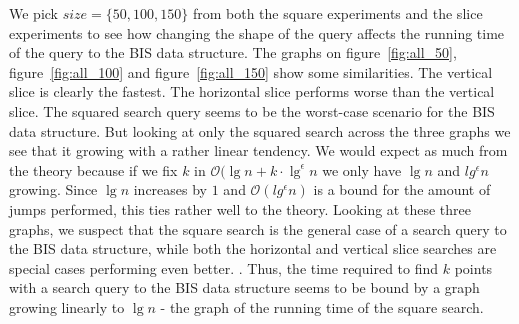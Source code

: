 We pick $size=\{50,100,150\}$ from both the square experiments and the slice experiments to see how changing the shape of the query affects the running time of the query to the BIS data structure. The graphs on figure~\ref{fig:all_50}, figure~\ref{fig:all_100} and figure~\ref{fig:all_150} show some similarities. The vertical slice is clearly the fastest. The horizontal slice performs worse than the vertical slice. The squared search query seems to be the worst-case scenario for the BIS data structure. But looking at only the squared search across the three graphs we see that it growing with a rather linear tendency. We would expect as much from the theory because if we fix $k$ in $\mathcal{O}(\lg n + k\cdot \lg^\epsilon n$ we only have $\lg n$ and $lg^\epsilon n$ growing. Since $\lg n$ increases by $1$ and $\mathcal{O}(lg^\epsilon n)$ is a bound for the amount of jumps performed, this ties rather well to the theory. Looking at these three graphs, we suspect that the square search is the general case of a search query to the BIS data structure, while both the horizontal and vertical slice searches are special cases performing even better. . Thus, the time required to find $k$ points with a search query to the BIS data structure seems to be bound by a graph growing linearly to $\lg n$ - the graph of the running time of the square search.


